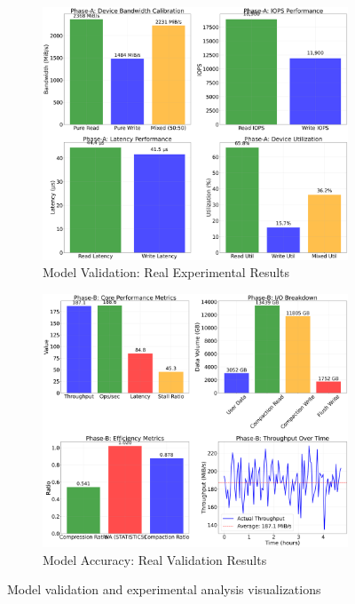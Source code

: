 \documentclass[11pt]{article}
\begin{document}
\begin{figure}[H]
\centering
\begin{subfigure}{0.48\textwidth}
\centering
\includegraphics[width=\textwidth]{experiments/2025-09-05/device_calibration_analysis.png}
\caption{Model Validation: Real Experimental Results}
\label{fig:simulation_vs_real}
\end{subfigure}
\hfill
\begin{subfigure}{0.48\textwidth}
\centering
\includegraphics[width=\textwidth]{experiments/2025-09-05/rocksdb_performance_analysis.png}
\caption{Model Accuracy: Real Validation Results}
\label{fig:model_evolution}
\end{subfigure}
\caption{Model validation and experimental analysis visualizations}
\end{figure}
\end{document}
